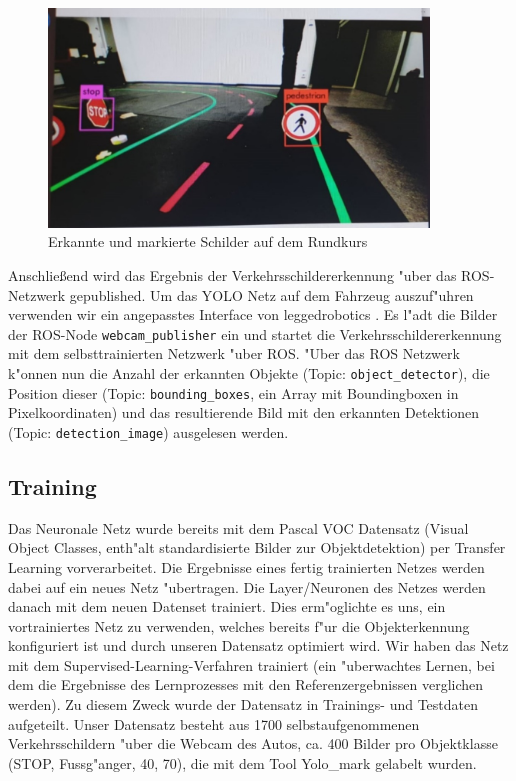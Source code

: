 \begin{figure}[h]
	\centering
	\includegraphics[width=0.9\textwidth,trim={0.5cm 1cm 1cm 1cm},clip]{images/boundingboxes}
	\caption{Erkannte und markierte Schilder auf dem Rundkurs}
	\label{fig:boundingboxes}
\end{figure}

Anschlie\ss end wird das Ergebnis der Verkehrsschildererkennung "uber das ROS-Netzwerk gepublished. Um das YOLO Netz auf dem Fahrzeug auszuf"uhren verwenden wir ein angepasstes Interface von leggedrobotics \cite{leggedrobotics}. Es l"adt die Bilder der ROS-Node \texttt{webcam\_publisher} ein und startet die Verkehrsschildererkennung mit dem selbsttrainierten Netzwerk "uber ROS. "Uber das ROS Netzwerk k"onnen nun die Anzahl der erkannten Objekte (Topic: \texttt{object\_detector}), die Position dieser (Topic: \texttt{bounding\_boxes}, ein Array mit Boundingboxen in Pixelkoordinaten) und das resultierende Bild mit den erkannten Detektionen (Topic: \texttt{detection\_image}) ausgelesen werden.

\subsection{Training}

Das Neuronale Netz wurde bereits mit dem Pascal VOC Datensatz (Visual Object Classes, enth"alt standardisierte Bilder zur Objektdetektion)
per Transfer Learning vorverarbeitet. Die Ergebnisse eines fertig trainierten Netzes werden dabei auf ein neues Netz "ubertragen. Die Layer/Neuronen des Netzes werden danach mit dem neuen Datenset trainiert.
Dies erm"oglichte es uns, ein vortrainiertes Netz zu verwenden, welches bereits f"ur die Objekterkennung konfiguriert ist und durch unseren Datensatz optimiert wird. Wir haben das Netz mit dem Supervised-Learning-Verfahren trainiert (ein "uberwachtes Lernen, bei dem die Ergebnisse des Lernprozesses mit den Referenzergebnissen verglichen werden).  Zu diesem Zweck wurde der Datensatz in Trainings- und Testdaten aufgeteilt. Unser Datensatz besteht aus 1700 selbstaufgenommenen Verkehrsschildern "uber die Webcam des Autos, ca. 400 Bilder pro Objektklasse (STOP, Fussg"anger, 40, 70), die mit dem Tool Yolo\_mark \cite{Yolo_mark} gelabelt wurden.


